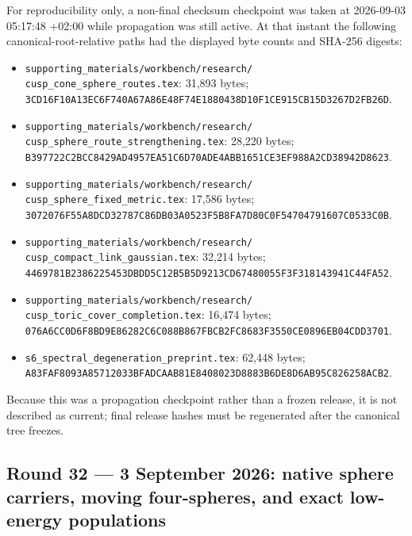 \begin{itemize}[leftmargin=1.8em]
For reproducibility only, a non-final checksum checkpoint was taken at
2026-09-03 05:17:48 +02:00 while propagation was still active.  At that
instant the following canonical-root-relative paths had the displayed byte
counts and SHA-256 digests:
\begin{itemize}[leftmargin=2em]
\item \texttt{supporting\_materials/workbench/research/
cusp\_cone\_sphere\_routes.tex}: 31,893 bytes;\\
\texttt{3CD16F10A13EC6F740A67A86E48F74E1880438D10F1CE915CB15D3267D2FB26D}.
\item \texttt{supporting\_materials/workbench/research/
cusp\_sphere\_route\_strengthening.tex}: 28,220 bytes;\\
\texttt{B397722C2BCC8429AD4957EA51C6D70ADE4ABB1651CE3EF988A2CD38942D8623}.
\item \texttt{supporting\_materials/workbench/research/
cusp\_sphere\_fixed\_metric.tex}: 17,586 bytes;\\
\texttt{3072076F55A8DCD32787C86DB03A0523F5B8FA7D80C0F54704791607C0533C0B}.
\item \texttt{supporting\_materials/workbench/research/
cusp\_compact\_link\_gaussian.tex}: 32,214 bytes;\\
\texttt{4469781B2386225453DBDD5C12B5B5D9213CD67480055F3F318143941C44FA52}.
\item \texttt{supporting\_materials/workbench/research/
cusp\_toric\_cover\_completion.tex}: 16,474 bytes;\\
\texttt{076A6CC0D6F8BD9E86282C6C088B867FBCB2FC8683F3550CE0896EB04CDD3701}.
\item \texttt{s6\_spectral\_degeneration\_preprint.tex}: 62,448 bytes;\\
\texttt{A83FAF8093A85712033BFADCAAB81E8408023D8883B6DE8D6AB95C826258ACB2}.
\end{itemize}
Because this was a propagation checkpoint rather than a frozen release, it
is not described as current; final release hashes must be regenerated after
the canonical tree freezes.
\end{itemize}

\subsection*{Round 32 --- 3 September 2026: native sphere carriers,
moving four-spheres, and exact low-energy populations}

